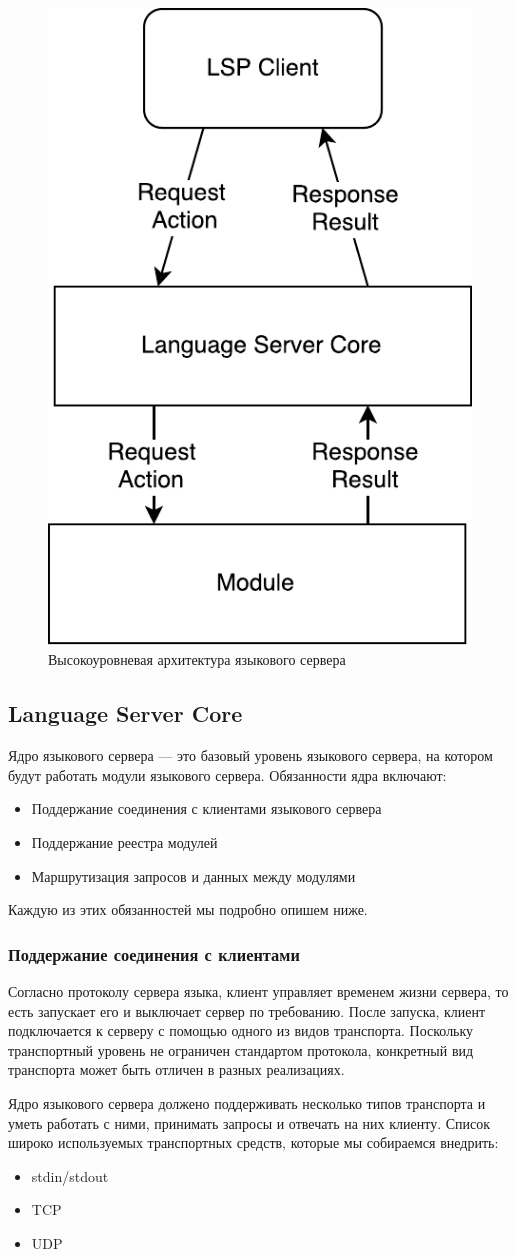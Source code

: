 \begin{figure}[H]
    \centering
    \includegraphics[width=.3\textwidth]{figs/highlevel_architecture.pdf}
    \caption{Высокоуровневая архитектура языкового сервера}
    \label{fig:met:ls_highlevel_arch}
\end{figure}

\subsection{Language Server Core}
\label{sec:met:arch:core}
Ядро языкового сервера --- это базовый уровень языкового сервера, на котором будут работать модули языкового сервера.
Обязанности ядра включают:
\begin{itemize}
    \item Поддержание соединения с клиентами языкового сервера
    \item Поддержание реестра модулей
    \item Маршрутизация запросов и данных между модулями
\end{itemize}

Каждую из этих обязанностей мы подробно опишем ниже.

\subsubsection{Поддержание соединения с клиентами}
\label{sec:met:arch:core:connection_maintenance}
Согласно протоколу сервера языка\cite{Sourcegraph}, клиент управляет временем жизни сервера, то есть запускает его и выключает сервер по требованию. 
После запуска, клиент подключается к серверу с помощью одного из видов транспорта. 
Поскольку транспортный уровень не ограничен стандартом протокола, конкретный вид транспорта может быть отличен в разных реализациях.

Ядро языкового сервера должено поддерживать несколько типов транспорта и уметь работать с ними, принимать запросы и отвечать на них клиенту. 
Список широко используемых транспортных средств, которые мы собираемся внедрить:
\begin{itemize}
    \item stdin/stdout
    \item TCP
    \item UDP
\end{itemize}

